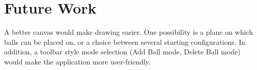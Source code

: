 \documentclass[letterpaper,10pt]{IEEEtran}
\begin{document}
\section{Future Work}
A better canvas would make drawing easier.
One possibility is a plane on which balls can be placed on, or a choice between several starting configurations.
In addition, a toolbar style mode selection (Add Ball mode, Delete Ball mode) would make the application more user-friendly.

%
\end{document}
